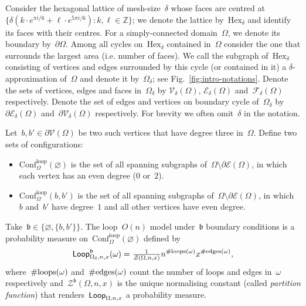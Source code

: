 \documentclass[reqno,11pt,a4paper]{amsart}
\theoremstyle{remark}
\newcommand{\calE}{\mathcal{E}}
\newcommand{\calV}{\mathcal{V}}
\newcommand{\bbZ}{\mathbb{Z}}
\newcommand{\Vertices}{\mathcal{V}}
\newcommand{\Edges}{\mathcal{E}}
\newcommand{\Faces}{\mathcal{F}}
\newcommand{\loops}{\mathrm{loops}}
\newcommand{\edges}{\mathrm{edges}}
\newcommand{\Hex}{\mathrm{Hex}}
\renewcommand{\b}{\mathfrak{b}}
\newcommand{\conf}{\mathrm{Conf}}
\newcommand\ConfOl[1]{\conf^{\mathrm{loop}}_\Omega(#1)}
\def\cZ{\mathcal Z}
\begin{document}
Consider the hexagonal lattice of mesh-size~$\delta$ whose faces are centred at~$\{\delta(k \cdot e^{\pi i/6}+\ell \cdot e^{5\pi i/6})\colon k,\ell\in\bbZ\}$; we denote the lattice by~$\Hex_\delta$ and identify its faces with their centres.
For a simply-connected domain~$\Omega$, we denote its boundary by~$\partial\Omega$.
Among all cycles on~$\Hex_\delta$ contained in~$\Omega$ consider the one that surrounds the largest area (i.e. number of faces).
We call the subgraph of~$\Hex_\delta$ consisting of vertices and edges surrounded by this cycle (or contained in it) a $\delta$-approximation of~$\Omega$ and denote it by~$\Omega_\delta$; see Fig.~\ref{fig:intro-notations}.
Denote the sets of vertices, edges and faces in~$\Omega_\delta$ by $\Vertices_\delta(\Omega)$, $\Edges_\delta(\Omega)$ and~$\Faces_\delta(\Omega)$ respectively.
Denote the set of edges and vertices on boundary cycle of~$\Omega_\delta$ by~$\partial\calE_\delta(\Omega)$ and~$\partial\Vertices_\delta(\Omega)$ respectively.
For brevity we often omit~$\delta$ in the notation.

Let~$b,b'\in \partial\calV(\Omega)$ be two such vertices that have degree three in~$\Omega$.
Define two sets of configurations:
\begin{itemize}
	\item $\ConfOl{\varnothing}$ is the set of all spanning subgraphs of~$\Omega\setminus \partial\calE(\Omega)$, in which each vertex has an even degree ($0$ or~$2$).
	\item $\ConfOl{b,b'}$ is the set of all spanning subgraphs of~$\Omega\setminus \partial\calE(\Omega)$, in which~$b$ and~$b'$ have degree~$1$ and all other vertices have even degree.
\end{itemize}
Take~$\b\in \{\varnothing , \{b,b'\}\}$.
The loop~$O(n)$ model under~$\b$ boundary conditions is a probability measure on~$\ConfOl{\varnothing}$ defined by
\begin{equation}\label{eq:def-loop-o-n}
	{\sf Loop}^\b_{\Omega_\delta,n,x}(\omega) = \tfrac{1}{\cZ(\Omega,n,x)}n^{\#\loops(\omega)}x^{\#\edges(\omega)},
\end{equation}
where~$\#{\rm loops}(\omega)$ and~$\#{\rm edges}(\omega)$ count the number of loops and edges in~$\omega$ respectively and~$\cZ^\b(\Omega,n,x)$ is the unique normalising constant (called {\em partition function}) that renders~${\sf Loop}_{\Omega,n,x}$ a probability measure.
\end{document}
